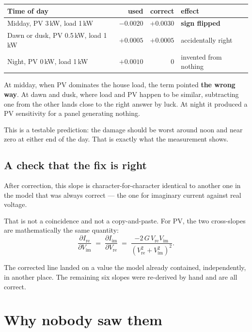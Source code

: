 \documentclass[11pt,a4paper]{article}
\begin{document}
\begin{center}
\begin{tabular}{@{}lrrl@{}}
\toprule
\textbf{Time of day} & \textbf{used} & \textbf{correct} & \textbf{effect} \\
\midrule
Midday, PV 3\,kW, load 1\,kW      & $-0.0020$ & $+0.0030$ & {\color{warm}\bfseries sign flipped} \\
Dawn or dusk, PV 0.5\,kW, load 1\,kW & $+0.0005$ & $+0.0005$ & accidentally right \\
Night, PV 0\,kW, load 1\,kW       & $+0.0010$ & $0$       & invented from nothing \\
\bottomrule
\end{tabular}
\end{center}

At midday, when PV dominates the house load, the term pointed \textbf{the wrong way}. At
dawn and dusk, where load and PV happen to be similar, subtracting one from the other
lands close to the right answer by luck. At night it produced a PV sensitivity for a
panel generating nothing.

This is a testable prediction: the damage should be worst around noon and near zero at
either end of the day. That is exactly what the measurement shows.

\subsection{A check that the fix is right}

After correction, this slope is character-for-character identical to another one in the
model that was always correct --- the one for imaginary current against real voltage.

That is not a coincidence and not a copy-and-paste. For PV, the two cross-slopes are
mathematically the same quantity:
\[
  \frac{\partial I_{\mathrm{re}}}{\partial V_{\mathrm{im}}}
  \;=\;
  \frac{\partial I_{\mathrm{im}}}{\partial V_{\mathrm{re}}}
  \;=\;
  \frac{-2\,G\,V_{\mathrm{re}} V_{\mathrm{im}}}
       {\left(V_{\mathrm{re}}^2 + V_{\mathrm{im}}^2\right)^2}.
\]

The corrected line landed on a value the model already contained, independently, in
another place. The remaining six slopes were re-derived by hand and are all correct.

\section{Why nobody saw them}
\end{document}
